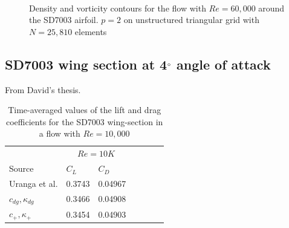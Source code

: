 \begin{figure}[htbp]
\centering
{}
\\

\caption{Density and vorticity contours for the flow with $Re = 60,000$ around the SD7003 airfoil. $p=2$ on unstructured triangular grid with $N = 25,810$ elements}
\label{sdairfoilre60k}
\end{figure}


\newpage

\subsection{SD7003 wing section at 4$^{\circ}$ angle of attack}
From David's thesis.

\begin{table}[htbp]
\centering
\begin{tabular}{ l| l l| l l| l l} 
  
 &  \multicolumn{2}{|c|}{$Re = 10K$}  \\ 
 Source & $C_L$ & $C_D$    \\ 
\hline
 Uranga et al.\cite{uranga2011implicit} & 0.3743 & 0.04967   \\ 
$c_{dg},\kappa_{dg}$ & 0.3466 & 0.04908  \\ 
$c_{+},\kappa_{+}$ & 0.3454 & 0.04903 \\ 
 \end{tabular}
\caption{Time-averaged values of the lift and drag coefficients for the SD7003 wing-section in a flow with $Re = 10,000$}
\label{table:sdWingForce} 
 \end{table}


